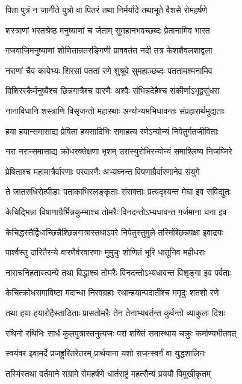 \twolineshloka
{पिता पुत्रं न जानीते पुत्रो वा पितरं तथा}
{निर्मर्यादे तथाभूते वैशसे रोमहर्षणे}


\twolineshloka
{शस्त्राणां भरतश्रेष्ठ मनुष्याणां च र्जताम्}
{सुमहानभवच्छब्दः प्रेतानामिव भारत}


\twolineshloka
{गजवाजिमनुष्याणां शोणितान्रतरङ्गिणी}
{प्राववर्तत नदी तत्र केशशैवलशाद्वला}


\twolineshloka
{नराणां चैव कायेभ्यः शिरसां पततां रणे}
{शुश्रुवे सुमहाञ्छब्दः पततामश्मनामिव}


\twolineshloka
{विशिरस्कैर्मनुष्यैश्च छिन्नगात्रैश्च वारणैः}
{अश्वैः संभिन्नदेहैश्च संकीर्णाऽभूद्वसुंधरा}


\twolineshloka
{नानाविधानि शस्त्राणि विसृजन्तो महारथाः}
{अन्योन्यमभिधावन्तः संप्रहारार्थमुद्यताः}


\twolineshloka
{हया हयान्समासाद्य प्रेषिता हयसादिभिः}
{समाहत्य रणेऽन्योन्यं निपेतुर्गतजीविताः}


\twolineshloka
{नरा नरान्समासाद्य क्रोधरक्तेक्षणा भृशम्}
{उरांस्युरोभिरन्योन्यं समाश्लिष्य निजघ्निरे}


\twolineshloka
{प्रेषिताश्च महामात्रैर्वारणाः परवारणैः}
{अभ्यघ्नन्त विषणाग्रैर्वारणानेव संयुगे}


\twolineshloka
{ते जातरुधिरोत्पीडाः पताकाभिरलङ्कृताः}
{संसक्ताः प्रत्यदृश्यन्त मेघा इव सविद्युतः}


\twolineshloka
{केचिद्भिन्ना विषाणाग्रैर्भिन्नकुम्भाश्च तोमरैः}
{विनदन्तोऽभ्यधावन्त गर्जमाना धना इव}


\twolineshloka
{केचिद्धस्तैर्द्विधाच्छिन्नैश्छिन्नगात्रास्तथाऽपरे}
{निपेतुस्तुमुले तस्मिंश्छिन्नपक्षा इवाद्रयः}


\twolineshloka
{पार्श्वैस्तु दारितैरन्ये वारणैर्वरवारणाः}
{मुमुचुः शोणितं भूरि धातूनिव महीधराः}


\twolineshloka
{नाराचनिहतास्त्वन्ये तथा विद्धाश्च तोमरैः}
{विनदन्तोऽभ्यधावन्त विशृङ्गा इव पर्वताः}


\twolineshloka
{केचित्क्रोधसमाविष्टा मदान्धा निरवग्रहाः}
{रथान्हयान्पदातींश्च ममृदुः शतशो रणे}


\twolineshloka
{तथा हया हयारोहैस्ताडिताः प्रासतोमरैः}
{तेन तेनाभ्यवर्तन्त कुर्वन्तो व्याकुला दिशः}


\twolineshloka
{रथिनो रथिभिः सार्धं कुलपुत्रास्तनुत्यजः}
{परां शक्तिं समास्थाय चक्रुः कर्माण्यभीतवत्}


\twolineshloka
{स्वयंवर इवामर्दे प्रजह्रुरितरेतरम्}
{प्रार्थयाना यशो राजन्स्वर्गं वा युद्धशालिनः}


\twolineshloka
{तस्मिंस्तथा वर्तमाने संग्रामे रोमहर्षणे}
{धार्तराष्ट्रं महत्सैन्यं प्रययौ विमुखीकृतम्}


